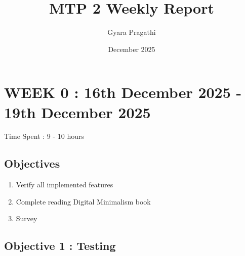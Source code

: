 \documentclass{article}
\title{MTP 2 Weekly Report}
\author{Gyara Pragathi}
\date{December 2025}
\begin{document}
\renewcommand{\arraystretch}{1.3}
\setlength{\tabcolsep}{6pt}

\maketitle

\tableofcontents

\newpage
\listoffigures

\newpage
\listoftables

\newpage
\lstlistoflistings

\newpage
\section{WEEK 0 : 16th December 2025 - 19th December 2025} 

Time Spent : 9 - 10 hours

\subsection{Objectives}
\begin{enumerate}
    \item Verify all implemented features
    \item Complete reading Digital Minimalism book
    \item Survey
\end{enumerate}
\subsection{Objective 1 : Testing}
\end{document}
